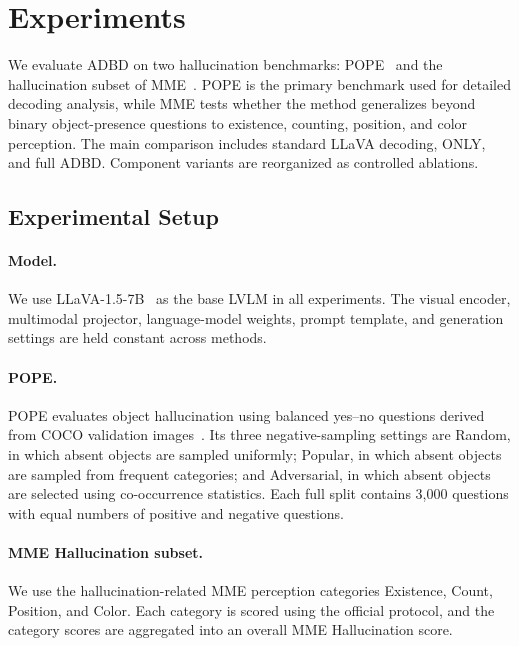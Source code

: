 \section{Experiments}
\label{sec:experiments}

We evaluate ADBD on two hallucination benchmarks: POPE~\cite{li2023pope} and the hallucination subset of MME~\cite{fu2023mme}. POPE is the primary benchmark used for detailed decoding analysis, while MME tests whether the method generalizes beyond binary object-presence questions to existence, counting, position, and color perception. The main comparison includes standard LLaVA decoding, ONLY, and full ADBD. Component variants are reorganized as controlled ablations.

\subsection{Experimental Setup}

\paragraph{Model.}
We use LLaVA-1.5-7B~\cite{liu2024visual} as the base LVLM in all experiments. The visual encoder, multimodal projector, language-model weights, prompt template, and generation settings are held constant across methods.

\paragraph{POPE.}
POPE evaluates object hallucination using balanced yes--no questions derived from COCO validation images~\cite{lin2014microsoft}. Its three negative-sampling settings are Random, in which absent objects are sampled uniformly; Popular, in which absent objects are sampled from frequent categories; and Adversarial, in which absent objects are selected using co-occurrence statistics. Each full split contains 3,000 questions with equal numbers of positive and negative questions.

\paragraph{MME Hallucination subset.}
We use the hallucination-related MME perception categories Existence, Count, Position, and Color. Each category is scored using the official protocol, and the category scores are aggregated into an overall MME Hallucination score.

